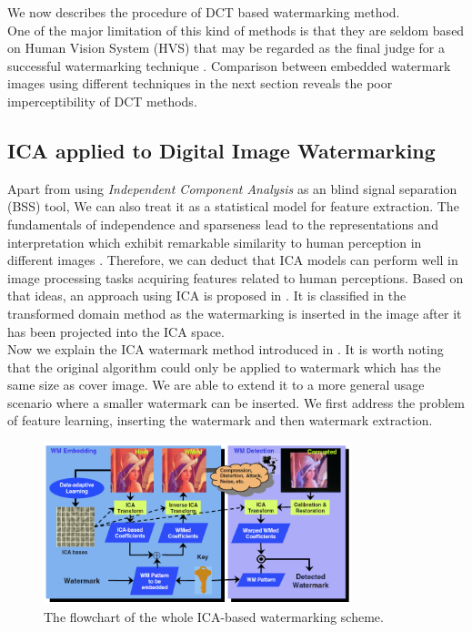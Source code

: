 We now describes the procedure of DCT based watermarking method.\\

One of the major limitation of this kind of methods is that they are seldom based on Human Vision System (HVS) that may be regarded as the final judge for a successful watermarking technique \cite{LuWei_ICA}. Comparison between embedded watermark images using different techniques in the next section reveals the poor imperceptibility of DCT methods.

\subsection{ICA applied to Digital Image Watermarking}
Apart from using \textit{Independent Component Analysis} as an blind signal separation (BSS) tool, We can also treat it as a statistical model for feature extraction. The fundamentals of independence and sparseness lead to the representations and interpretation which exhibit remarkable similarity to human perception in different images \cite{BELL19973327}. Therefore, we can deduct that ICA
models can perform well in image processing tasks acquiring features related to human perceptions. Based on that ideas, an approach using ICA is proposed in \cite{inproceedingsICA_watermark}. It is classified in the transformed domain method as the watermarking is inserted in the image after it has been projected into the ICA space. \\

Now we explain the ICA watermark method introduced in \cite{inproceedingsICA_watermark}. It is worth noting that the original algorithm could only be applied to watermark which has the same size as cover image. We are able to extend it to a more general usage scenario where a smaller watermark can be inserted. We first address the problem of feature learning, inserting the watermark and then watermark extraction.

\begin{figure}[H]
\centering
\includegraphics[width=0.8\textwidth]{images/ICA_flowchart.PNG}
\caption{The flowchart of the whole ICA-based watermarking scheme. \cite{LuWei_ICA}}
\label{flow_ICA}
\end{figure}


